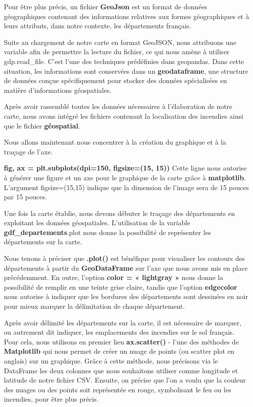 \documentclass[
]{article}
\begin{document}
Pour être plus précis, un fichier \textbf{GeoJson} est un format de
données géographiques contenant des informations relatives aux formes
géographiques et à leurs attributs, dans notre contexte, les
départements français.

Suite au chargement de notre carte en format GeoJSON, nous attribuons
une variable afin de permettre la lecture du fichier, ce qui nous amène
à utiliser gdp.read\_file. C'est l'une des techniques prédéfinies dans
geopandas. Dans cette situation, les informations sont conservées dans
un \textbf{geodataframe}, une structure de données conçue spécifiquement
pour stocker des données spécialisées en matière d'informations
géospatiales.

Après avoir rassemblé toutes les données nécessaires à l'élaboration de
notre carte, nous avons intégré les fichiers contenant la localisation
des incendies ainsi que le fichier \textbf{géospatial}.

Nous allons maintenant nous concentrer à la création du graphique et à
la traçage de l'axe.

\textbf{fig, ax = plt.subplots(dpi=150, figsize=(15, 15))} Cette ligne
nous autorise à générer une figure et un axe pour le graphique de la
carte grâce à \textbf{matplotlib}. L'argument figsize=(15,15) indique
que la dimension de l'image sera de 15 pouces par 15 pouces.

Une fois la carte établie, nous devons débuter le traçage des
départements en exploitant les données géospatiales. L'utilisation de la
variable \textbf{gdf\_departements}.plot nous donne la possibilité de
représenter les départements sur la carte.

Nous tenons à préciser que \textbf{.plot()} est bénéfique pour
visualiser les contours des départements à partir du
\textbf{GeoDataFrame} sur l'axe que nous avons mis en place
précédemment. En outre, l'option \textbf{color = « lightgray »} nous
donne la possibilité de remplir en une teinte grise claire, tandis que
l'option \textbf{edgecolor} nous autorise à indiquer que les bordures
des départements sont dessinées en noir pour mieux marquer la
délimitation de chaque département.

Après avoir délimité les départements sur la carte, il est nécessaire de
marquer, ou autrement dit indiquer, les emplacements des incendies sur
le sol français. Pour cela, nous utilisons en premier lieu
\textbf{ax.scatter()} - l'une des méthodes de \textbf{Matplotlib} qui
nous permet de créer un nuage de points (ou scatter plot en anglais) sur
un graphique. Grâce à cette méthode, nous précisons via le DataFrame les
deux colonnes que nous souhaitons utiliser comme longitude et latitude
de notre fichier CSV. Ensuite, on précise que l'on a voulu que la
couleur des nuages ou des points soit représentée en rouge, symbolisant
le feu ou les incendies, pour être plus précis.
\end{document}
